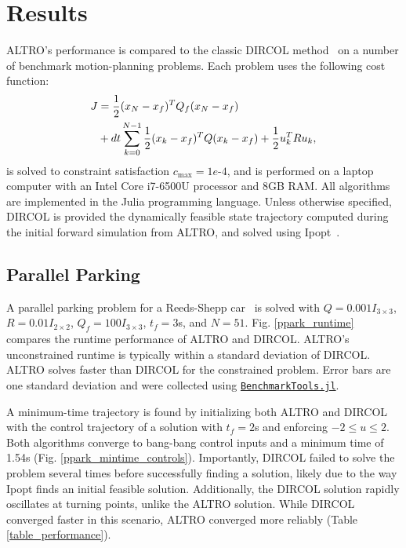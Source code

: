 \documentclass[../root.tex]{subfiles}
\begin{document}
\section{Results}
ALTRO's performance is compared to the classic DIRCOL
method~\cite{hargraves_Direct_1987} on a number of benchmark motion-planning problems.
Each problem uses the following cost function:
\begin{align}
    J &= \frac{1}{2}(x_N - x_f)^T Q_f(x_N - x_f) \\
    &+ dt\sum_{k=0}^{N-1} \frac{1}{2}(x_k- x_f)^T Q(x_k - x_f) + \frac{1}{2}u_k^T R u_k, \notag
\end{align}
is solved to constraint satisfaction $c_{\max} = 1e\text{-}4$, and is
performed on a laptop computer with an Intel Core i7-6500U processor and 8GB
RAM. All algorithms are implemented in the Julia programming language. Unless
otherwise specified, DIRCOL is provided the dynamically feasible state
trajectory computed during the initial forward simulation from ALTRO, and
solved using Ipopt~\cite{wachter_implementation_2006}.


\subsection{Parallel Parking}
    A parallel parking problem for a Reeds-Shepp car~\cite{reeds_Optimal_1990} is
    solved with $Q = 0.001 I_{3 \times 3}$, $R = 0.01I_{2 \times 2} $, $Q_f =
    100I_{3 \times 3}$, $t_f = 3$s, and $N = 51$. Fig. \ref{ppark_runtime}
    compares the runtime performance of ALTRO and DIRCOL. ALTRO's
    unconstrained runtime is typically within a standard deviation of DIRCOL.
    ALTRO solves faster than DIRCOL for the constrained problem. Error bars
    are one standard deviation and were collected using
    \href{https://github.com/JuliaCI/BenchmarkTools.jl}{\texttt{BenchmarkTools.jl}}.
    
    A minimum-time trajectory is found by initializing both ALTRO and DIRCOL
    with the control trajectory of a solution with $t_f = 2$s and enforcing
    $-2 \leq u \leq 2$. Both algorithms converge to bang-bang control inputs
    and a minimum time of 1.54s (Fig. \ref{ppark_mintime_controls}).
    Importantly, DIRCOL failed to solve the problem several times before
    successfully finding a solution, likely due to the way Ipopt finds an
    initial feasible solution. Additionally, the DIRCOL solution rapidly
    oscillates at turning points, unlike the ALTRO solution. While DIRCOL
    converged faster in this scenario, ALTRO converged more reliably (Table
    \ref{table_performance}).
   
\end{document}
